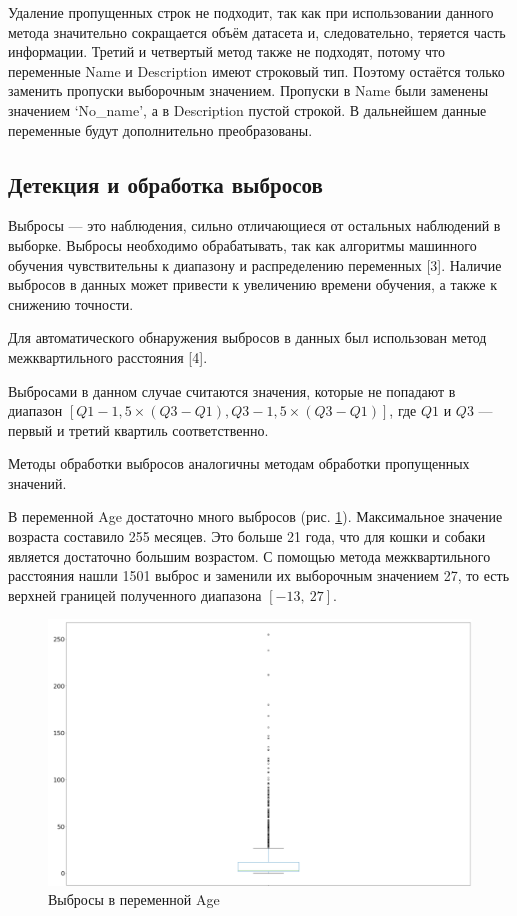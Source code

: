 \documentclass[14pt]{mmcs_article}
\begin{document}
Удаление пропущенных строк не подходит, так как при использовании данного метода значительно сокращается объём датасета и, следовательно, теряется часть информации. Третий и четвертый метод также не подходят, потому что переменные Name и Description имеют строковый тип. Поэтому остаётся только заменить пропуски выборочным значением. 
Пропуски в Name были заменены значением `No\_name', а в Description пустой строкой. В дальнейшем данные переменные будут дополнительно преобразованы.


\subsection{Детекция и обработка выбросов}

Выбросы — это наблюдения, сильно отличающиеся от остальных наблюдений в выборке. Выбросы необходимо обрабатывать, так как алгоритмы машинного обучения чувствительны к диапазону и распределению переменных [3]. Наличие выбросов в данных может привести к увеличению времени обучения, а также к снижению точности.

Для автоматического обнаружения выбросов в данных был использован метод межквартильного расстояния [4]. 

Выбросами в данном случае считаются значения, которые не попадают в диапазон $[Q1 - 1,5 \times (Q3 - Q1), Q3 - 1,5 \times (Q3 - Q1)]$, где $Q1$ и $Q3$ --- первый и третий квартиль соответственно.

Методы обработки выбросов аналогичны методам обработки пропущенных значений. 

В переменной Age достаточно много выбросов (рис. \ref{analyse:ageoutlier}). Максимальное значение возраста составило 255 месяцев. Это больше 21 года, что для кошки и собаки является достаточно большим возрастом. С помощью метода межквартильного расстояния нашли 1501 выброс и заменили их выборочным значением 27, то есть верхней границей полученного диапазона $[-13,\ 27]$.

\begin{figure}[H]
	\centering
	\includegraphics[scale=0.7]{ageoutlier.png}
	\caption{Выбросы в переменной Age}\label{analyse:ageoutlier}
\end{figure}
\end{document}
